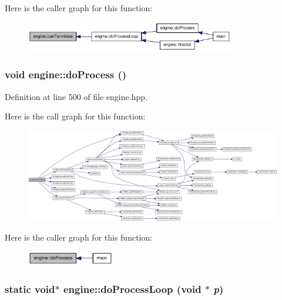 Here is the caller graph for this function:\nopagebreak
\begin{figure}[H]
\begin{center}
\leavevmode
\includegraphics[width=259pt]{classengine_acf7ab54eb2e616e471686ec14157c9e7_icgraph}
\end{center}
\end{figure}
\hypertarget{classengine_ad485fec9e6edc79fd24065e98736c290}{
\subsubsection[{doProcess}]{\setlength{\rightskip}{0pt plus 5cm}void engine::doProcess ()}}
\label{classengine_ad485fec9e6edc79fd24065e98736c290}


Definition at line 500 of file engine.hpp.

Here is the call graph for this function:\nopagebreak
\begin{figure}[H]
\begin{center}
\leavevmode
\includegraphics[width=420pt]{classengine_ad485fec9e6edc79fd24065e98736c290_cgraph}
\end{center}
\end{figure}


Here is the caller graph for this function:\nopagebreak
\begin{figure}[H]
\begin{center}
\leavevmode
\includegraphics[width=108pt]{classengine_ad485fec9e6edc79fd24065e98736c290_icgraph}
\end{center}
\end{figure}
\hypertarget{classengine_a4e7f59155ec8ac715c490a7006489d76}{
\subsubsection[{doProcessLoop}]{\setlength{\rightskip}{0pt plus 5cm}static void$\ast$ engine::doProcessLoop (void $\ast$ {\em p})}}
\label{classengine_a4e7f59155ec8ac715c490a7006489d76}


